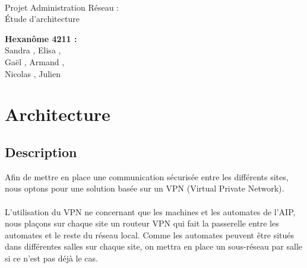 \documentclass[a4paper]{article}
\begin{document}
\begin{titlepage}
	~ 
	\vfill
	\begin{center}
		\begin{Huge}
			Projet Administration Réseau : \\ Étude d'architecture\\
		\end{Huge}
	\vfill
		\textbf{Hexanôme 4211 :} 
			\\Sandra {}, Elisa , 
			\\Gaël , Armand , 
			\\Nicolas {}, Julien \\
	\vfill
	\end{center}
	\vfill
\end{titlepage}

\newpage
\tableofcontents
\newpage

\section{Architecture}

	\subsection{Description} %
	
	Afin de mettre en place une communication sécurisée entre les différents sites, nous optons pour une solution basée sur un VPN (Virtual Private Network). 
	
	\paragraph*{} %
	L'utilisation du VPN ne concernant que les machines et les automates de l'AIP, nous plaçons sur chaque site un routeur VPN qui fait la passerelle entre les automates et le reste du réseau local. Comme les automates peuvent être situés dans différentes salles sur chaque site, on mettra en place un sous-réseau par salle si ce n'est pas déjà le cas. 
	
	\paragraph*{} %
	
	
\end{document}
